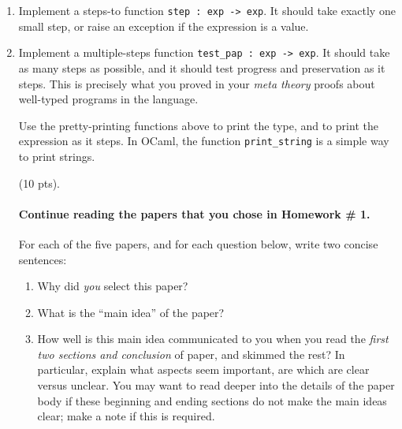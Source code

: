\documentclass[11pt]{article}
\newcounter{question}[section]
\newcounter{taskcounter}
\newcounter{taskPercentCounter}
\newcommand{\task}[1]
  {\bigskip \noindent {\bf Task\addtocounter{taskPercentCounter}{#1} \arabic{taskcounter}\addtocounter{taskcounter}{1}} (#1 pts).}
\begin{document}
\begin{enumerate}

\item Implement a steps-to function \texttt{step : exp -> exp}. It
  should take exactly one small step, or raise an exception if the
  expression is a value.

\item Implement a multiple-steps function \texttt{test\_pap : exp ->
  exp}. It should take as many steps as possible, and it should test
  progress and preservation as it steps.  This is precisely what you
  proved in your \emph{meta theory} proofs about well-typed programs
  in the language.  
  
  Use the pretty-printing functions above to print the type, and to
  print the expression as it steps.  In OCaml, the function
  \texttt{print\_string} is a simple way to print strings.

%

\task{10} \paragraph{Continue reading the papers that you chose in Homework \# 1.}

For each of the five papers, and for each question below, write two concise sentences:
\begin{enumerate}
\item Why did \emph{you} select this paper?
\item What is the ``main idea'' of the paper?
\item How well is this main idea communicated to you when you read the
  \emph{first two sections and conclusion} of paper, and skimmed the
  rest?  In particular, explain what aspects seem important, are which
  are clear versus unclear.  You may want to read deeper into the
  details of the paper body if these beginning and ending sections do
  not make the main ideas clear; make a note if this is required.
\end{enumerate}



\end{enumerate}
\end{document}
